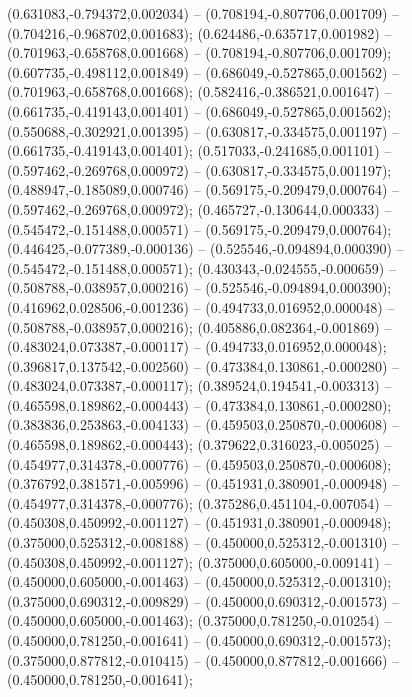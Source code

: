  (0.631083,-0.794372,0.002034) -- (0.708194,-0.807706,0.001709) -- (0.704216,-0.968702,0.001683);
 (0.624486,-0.635717,0.001982) -- (0.701963,-0.658768,0.001668) -- (0.708194,-0.807706,0.001709);
 (0.607735,-0.498112,0.001849) -- (0.686049,-0.527865,0.001562) -- (0.701963,-0.658768,0.001668);
 (0.582416,-0.386521,0.001647) -- (0.661735,-0.419143,0.001401) -- (0.686049,-0.527865,0.001562);
 (0.550688,-0.302921,0.001395) -- (0.630817,-0.334575,0.001197) -- (0.661735,-0.419143,0.001401);
 (0.517033,-0.241685,0.001101) -- (0.597462,-0.269768,0.000972) -- (0.630817,-0.334575,0.001197);
 (0.488947,-0.185089,0.000746) -- (0.569175,-0.209479,0.000764) -- (0.597462,-0.269768,0.000972);
 (0.465727,-0.130644,0.000333) -- (0.545472,-0.151488,0.000571) -- (0.569175,-0.209479,0.000764);
 (0.446425,-0.077389,-0.000136) -- (0.525546,-0.094894,0.000390) -- (0.545472,-0.151488,0.000571);
 (0.430343,-0.024555,-0.000659) -- (0.508788,-0.038957,0.000216) -- (0.525546,-0.094894,0.000390);
 (0.416962,0.028506,-0.001236) -- (0.494733,0.016952,0.000048) -- (0.508788,-0.038957,0.000216);
 (0.405886,0.082364,-0.001869) -- (0.483024,0.073387,-0.000117) -- (0.494733,0.016952,0.000048);
 (0.396817,0.137542,-0.002560) -- (0.473384,0.130861,-0.000280) -- (0.483024,0.073387,-0.000117);
 (0.389524,0.194541,-0.003313) -- (0.465598,0.189862,-0.000443) -- (0.473384,0.130861,-0.000280);
 (0.383836,0.253863,-0.004133) -- (0.459503,0.250870,-0.000608) -- (0.465598,0.189862,-0.000443);
 (0.379622,0.316023,-0.005025) -- (0.454977,0.314378,-0.000776) -- (0.459503,0.250870,-0.000608);
 (0.376792,0.381571,-0.005996) -- (0.451931,0.380901,-0.000948) -- (0.454977,0.314378,-0.000776);
 (0.375286,0.451104,-0.007054) -- (0.450308,0.450992,-0.001127) -- (0.451931,0.380901,-0.000948);
 (0.375000,0.525312,-0.008188) -- (0.450000,0.525312,-0.001310) -- (0.450308,0.450992,-0.001127);
 (0.375000,0.605000,-0.009141) -- (0.450000,0.605000,-0.001463) -- (0.450000,0.525312,-0.001310);
 (0.375000,0.690312,-0.009829) -- (0.450000,0.690312,-0.001573) -- (0.450000,0.605000,-0.001463);
 (0.375000,0.781250,-0.010254) -- (0.450000,0.781250,-0.001641) -- (0.450000,0.690312,-0.001573);
 (0.375000,0.877812,-0.010415) -- (0.450000,0.877812,-0.001666) -- (0.450000,0.781250,-0.001641);
